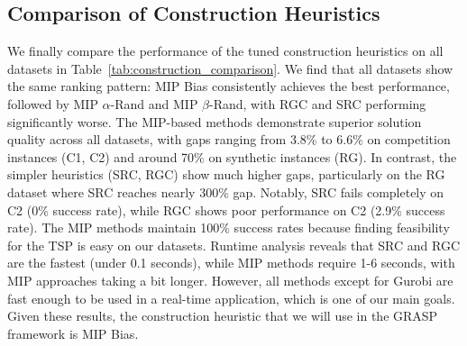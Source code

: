 \subsection{Comparison of Construction Heuristics}

We finally compare the performance of the tuned construction heuristics on all datasets in Table~\ref{tab:construction_comparison}.
We find that all datasets show the same ranking pattern: MIP Bias consistently achieves the best performance, followed by MIP $\alpha$-Rand and MIP $\beta$-Rand, with RGC and SRC performing significantly worse.
The MIP-based methods demonstrate superior solution quality across all datasets, with gaps ranging from 3.8\% to 6.6\% on competition instances (C1, C2) and around 70\% on synthetic instances (RG).
In contrast, the simpler heuristics (SRC, RGC) show much higher gaps, particularly on the RG dataset where SRC reaches nearly 300\% gap. Notably, SRC fails completely on C2 (0\% success rate), while RGC shows poor performance on C2 (2.9\% success rate).
The MIP methods maintain 100\% success rates because finding feasibility for the TSP is easy on our datasets. Runtime analysis reveals that SRC and RGC are the fastest (under 0.1 seconds), while MIP methods require 1-6 seconds, with MIP approaches taking a bit longer.
However, all methods except for Gurobi are fast enough to be used in a real-time application, which is one of our main goals.
Given these results, the construction heuristic that we will use in the GRASP framework is MIP Bias.


